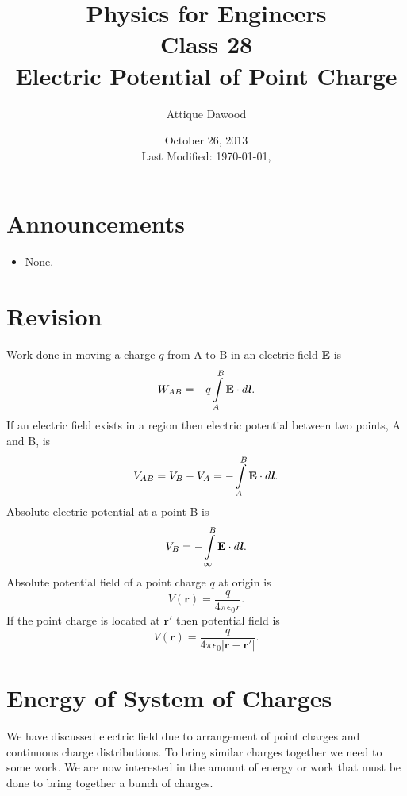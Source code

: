 \documentclass[12pt,a4paper]{article}
\title{\vspace{-3cm}Physics for Engineers\\Class 28\\Electric Potential of Point Charge}
\author{Attique Dawood}
\date{October 26, 2013\\[0.2cm] Last Modified: \today, \currenttime}
\begin{document}
\maketitle
\section{Announcements}
\begin{itemize}
\item None.
\end{itemize}
\section{Revision}
Work done in moving a charge $q$ from A to B in an electric field \textbf{E} is
\begin{equation}
W_{AB}=-q\int\limits_{A}^{B} \textbf{E}\cdot d\textbf{\textit{l}}.
\end{equation}
If an electric field exists in a region then electric potential between two points, A and B, is
\begin{equation}
V_{AB}=V_B-V_A=-\int\limits_{A}^{B} \textbf{E}\cdot d\textbf{\textit{l}}.
\end{equation}
Absolute electric potential at a point B is
\begin{equation}
V_{B}=-\int\limits_{\infty}^{B} \textbf{E}\cdot d\textbf{\textit{l}}.
\end{equation}
Absolute potential field of a point charge $q$ at origin is
\begin{equation}
V(\textbf{r})=\dfrac{q}{4\pi\epsilon_0r}.
\end{equation}
If the point charge is located at $\textbf{r}'$ then potential field is
\begin{equation}
V(\textbf{r})=\dfrac{q}{4\pi\epsilon_0|\textbf{r}-\textbf{r}'|}.
\end{equation}
\section{Energy of System of Charges}
We have discussed electric field due to arrangement of point charges and continuous charge distributions. To bring similar charges together we need to some work. We are now interested in the amount of energy or work that must be done to bring together a bunch of charges.
\end{document}
